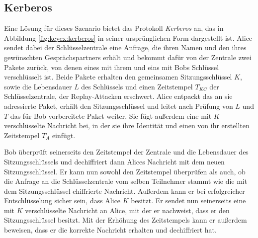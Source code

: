 \subsection{Kerberos}
Eine Lösung für dieses Szenario bietet das Protokoll \emph{Kerberos}
\indexKerberos an, das in Abbildung \ref{fig:keyex:kerberos} in seiner
ursprünglichen Form dargestellt ist. Alice sendet dabei der
Schlüsselzentrale eine Anfrage, die ihren Namen und den ihres
gewünschten Gesprächspartners erhält und bekommt dafür von der Zentrale
zwei Pakete zurück, von denen eines mit ihrem und eins mit Bobs
Schlüssel verschlüsselt ist. Beide Pakete erhalten den gemeinsamen
Sitzungsschlüssel $K$, sowie die Lebensdauer $L$ des Schlüssels und
einen Zeitstempel $T_{KC}$ der Schlüsselzentrale, der Replay-Attacken
erschwert.  Alice entpackt das an sie adressierte Paket, erhält den
Sitzungsschlüssel und leitet nach Prüfung von $L$ und $T$ das für Bob
vorbereitete Paket weiter. Sie fügt außerdem eine mit $K$ verschlüsselte
Nachricht bei, in der sie ihre Identität und einen von ihr erstellten
Zeitstempel $T_A$ einfügt.

Bob überprüft seinerseits den Zeitstempel der Zentrale und die
Lebensdauer des Sitzungsschlüssels und dechiffriert dann Alices
Nachricht mit dem neuen Sitzungsschlüssel. Er kann nun sowohl den
Zeitstempel überprüfen als auch, ob die Anfrage an die Schlüsselzentrale
vom selben Teilnehmer stammt wie die mit dem Sitzungsschlüssel
chiffrierte Nachricht. Außerdem kann er bei erfolgreicher
Entschlüsselung sicher sein, dass Alice $K$ besitzt. Er sendet nun
seinerseits eine mit $K$ verschlüsselte Nachricht an Alice, mit der er
nachweist, dass er den Sitzungsschlüssel besitzt. Mit der Erhöhung des
Zeitstempels kann er außerdem beweisen, dass er die korrekte Nachricht
erhalten und dechiffriert hat.

